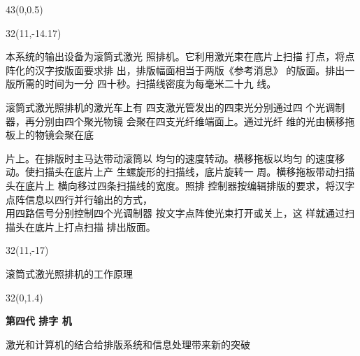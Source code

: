 \documentclass[linespread=1]{ctexart}
\begin{document}
\begin{textblock*}{43\ccwd}(0\ccwd,0.5\ccwd)
\begin{minipage}{43\ccwd}
{\hfill {} 
%
%
    \hfill }
\end{minipage}
\end{textblock*}
\begin{textblock*}{32\ccwd}(11\ccwd,-14.17\ccwd)
\begin{minipage}[t]{16\ccwd}
\setlength{\parindent}{2\ccwd}
本系统的输出设备为滚筒式激光
照排机。它利用激光束在底片上扫描
打点，将点阵化的汉字按版面要求排
出，排版幅面相当于两版《参考消息》
的版面。排出一版所需的时间为一分
四十秒。扫描线密度为每毫米二十九
线。

滚筒式激光照排机的激光车上有
四支激光管发出的四束光分别通过四
个光调制器，再分别由四个聚光物镜
会聚在四支光纤维端面上。通过光纤
维的光由横移拖板上的物镜会聚在底
\end{minipage}%
\hspace{\ccwd}%
\begin{minipage}[t]{15\ccwd}
片上。在排版时主马达带动滚筒以
均匀的速度转动。横移拖板以均匀
的速度移动。使扫描头在底片上产
生螺旋形的扫描线，底片旋转一\linebreak
周。横移拖板带动扫描头在底片上
横向移过四条扫描线的宽度。照排
控制器按编辑排版的要求，将汉字
点阵信息以四行并行输出的方式，\\
用四路信号分别控制四个光调制器
按文字点阵使光束打开或关上，这
样就通过扫描头在底片上打点扫描
排出版面。
\end{minipage}%
\end{textblock*}
\begin{textblock*}{32\ccwd}(11\ccwd,-17\ccwd)
{\hspace*{3\ccwd}}\begin{minipage}[t]{26\ccwd}
\LARGE\heiti 滚筒式激光照排机的工作原理\linebreak
\end{minipage}%
\end{textblock*}

\begin{textblock*}{32\ccwd}(0\ccwd,1.4\ccwd) %
\begin{center}
\begin{minipage}[t]{27\ccwd}
{\LARGE \textbf{第四代 排字 机}}\linebreak
\vspace{-1\ccwd}
\begin{center}
{\heiti 激光和计算机的结合给排版系统和信息处理带来新的突破}
\end{center}
\end{minipage}%
\end{center}
\end{textblock*}
\vspace{7.43\ccwd}
\end{document}
